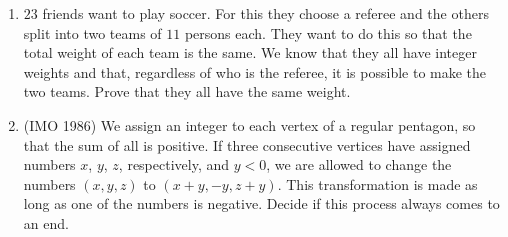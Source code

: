 \documentclass[12pt]{scrartcl}
\begin{document}
\begin{enumerate}
\item $23$ friends want to play soccer. For this they choose a referee and the others split into two teams of $11$ persons each. They want to do this so that the total weight of each team is the same. We know that they all have integer weights and that, regardless of who is the referee, it is possible to make the two teams. Prove that they all have the same weight.

\item (IMO 1986) We assign an integer to each vertex of a regular pentagon, so that the sum of all is positive. If three consecutive vertices have assigned numbers $x$, $y$, $z$, respectively, and $y < 0$, we are allowed to change the numbers $(x,y,z)$ to $(x + y,-y,z + y)$. This transformation is made as long as one of the numbers is negative. Decide if this process always comes to an end.


\end{enumerate}
\end{document}
